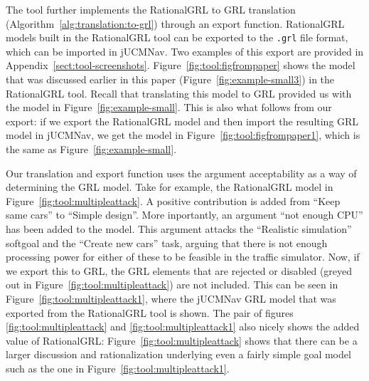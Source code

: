 The tool further implements the RationalGRL to GRL translation (Algorithm~\ref{alg:translation:to-grl}) through an export function. RationalGRL models built in the RationalGRL tool can be exported to the \texttt{.grl} file format, which can be imported in jUCMNav. Two examples of this export are provided in Appendix~\ref{sect:tool-screenshots}. Figure~\ref{fig:tool:figfrompaper} shows the model that was discussed earlier in this paper (Figure~\ref{fig:example-small3}) in the RationalGRL tool. Recall that translating this model to GRL provided us with the model in Figure~\ref{fig:example-small}. This is also what follows from our export: if we export the RationalGRL model and then import the resulting GRL model in jUCMNav, we get the model in Figure~\ref{fig:tool:figfrompaper1}, which is the same as Figure~\ref{fig:example-small}.

Our translation and export function uses the argument acceptability as a way of determining the GRL model. Take for example, the RationalGRL model in Figure~\ref{fig:tool:multipleattack}. A positive contribution is added from ``Keep same cars'' to ``Simple design''. More inportantly, an argument ``not enough CPU'' has been added to the model. This argument attacks the ``Realistic simulation'' softgoal and the ``Create new cars'' task, arguing that there is not enough processing power for either of these to be feasible in the traffic simulator. Now, if we export this to GRL, the GRL elements that are rejected or disabled (greyed out in Figure~\ref{fig:tool:multipleattack}) are not included. This can be seen in Figure~\ref{fig:tool:multipleattack1}, where the jUCMNav GRL model that was exported from the RationalGRL tool is shown. The pair of figures \ref{fig:tool:multipleattack} and \ref{fig:tool:multipleattack1} also nicely shows the added value of RationalGRL: Figure~\ref{fig:tool:multipleattack} shows that there can be a larger discussion and rationalization underlying even a fairly simple goal model such as the one in Figure~\ref{fig:tool:multipleattack1}. 

   

 

